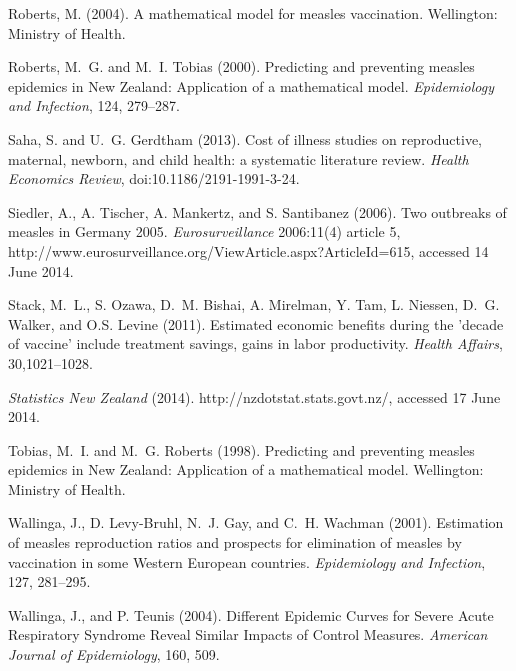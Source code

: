 \documentclass{article}
\begin{document}
{\begin{thebibliography}{}
Roberts, M. (2004).
\newblock A mathematical model for measles vaccination.
\newblock Wellington: Ministry of Health.

Roberts, M.~G. and M.~I. Tobias (2000).
\newblock Predicting and preventing measles epidemics in New Zealand: Application of a mathematical model. 
\newblock \emph{Epidemiology and Infection}, 124, 279--287.

Saha, S. and U.~G. Gerdtham (2013).
\newblock Cost of illness studies on reproductive, maternal, newborn, and child health: a systematic literature review.
\newblock \emph{Health Economics Review}, doi:10.1186/2191-1991-3-24.

Siedler, A., A. Tischer, A. Mankertz, and S. Santibanez (2006).
\newblock Two outbreaks of measles in Germany 2005.
\newblock \emph{Eurosurveillance} 2006:11(4) article 5, http://www.eurosurveillance.org/ViewArticle.aspx?ArticleId=615, accessed 14 June 2014.

Stack, M.~L., S. Ozawa, D.~M. Bishai, A. Mirelman, Y. Tam, L. Niessen, D.~G. Walker, and O.S. Levine (2011).
\newblock Estimated economic benefits during the 'decade of vaccine' include treatment savings, gains in labor productivity.
\newblock \emph{Health Affairs}, 30,1021--1028.

\newblock \emph{Statistics New Zealand} (2014).
http://nzdotstat.stats.govt.nz/, accessed 17 June 2014.

Tobias, M.~I. and M.~G. Roberts (1998).
\newblock Predicting and preventing measles epidemics in New Zealand: Application of a mathematical model.
\newblock Wellington: Ministry of Health.

Wallinga, J., D. Levy-Bruhl, N.~J. Gay, and C.~H. Wachman (2001).
\newblock Estimation of measles reproduction ratios and prospects for elimination of measles by vaccination in some Western European countries.
\newblock \emph{Epidemiology and Infection}, 127, 281--295.

Wallinga, J., and P. Teunis (2004).
\newblock Different Epidemic Curves for Severe Acute Respiratory Syndrome Reveal Similar Impacts of Control Measures.
\newblock \emph{American Journal of Epidemiology}, 160, 509.


\end{thebibliography}}
\end{document}
